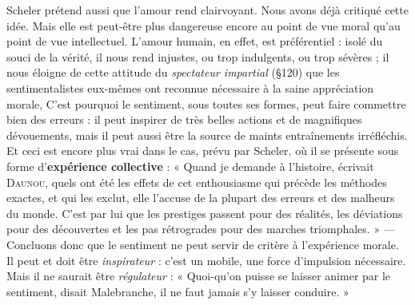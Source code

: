 Scheler prétend aussi que l’amour rend clairvoyant. Nous avons
déjà critiqué cette idée. Mais elle est peut-être plus dangereuse encore
au point de vue moral qu’au point de vue intellectuel. L'amour
humain, en effet, est préférentiel : isolé du souci de la vérité, il nous rend
injustes, ou trop indulgents, ou trop sévères ; il nous éloigne de cette
attitude du {\it spectateur impartial} (\S 120) que les sentimentalistes eux-mêmes
ont reconnue nécessaire à la saine appréciation morale, C’est
pourquoi le sentiment, sous toutes ses formes, peut faire commettre
bien des erreurs : il peut inspirer de très belles actions et de magnifiques
dévouements, mais il peut aussi être la source de maints entraînements
irréfléchis. Et ceci est encore plus vrai dans le cas, prévu par
Scheler, où il se présente sous forme d’{\bf expérience collective} : « Quand
je demande à l’histoire, écrivait \textsc{Daunou}, quels ont été les effets de cet
enthousiasme qui précède les méthodes exactes, et qui les exclut,
elle l’accuse de la plupart des erreurs et des malheurs du monde. C’est
par lui que les prestiges passent pour des réalités, les déviations pour
des découvertes et les pas rétrogrades pour des marches triomphales. »
— Concluons donc que le sentiment ne peut servir de critère à l’expérience
morale. Il peut et doit être {\it inspirateur} : c’est un mobile, une
force d’impulsion nécessaire. Mais il ne saurait être {\it régulateur} : « Quoi-qu’on
puisse se laisser animer par le sentiment, disait Malebranche,
il ne faut jamais s’y laisser conduire. »


